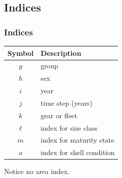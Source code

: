 \documentclass{beamer}
\begin{document}
\subsection{Indices}
\begin{frame}
\frametitle{Indices}
\begin{table}
  \centering
  \begin{tabular}{cl}
  \hline
  Symbol  & Description \\
  \hline
      $g$ & group \\
      $h$ & sex \\
      $i$ & year \\
      $j$ & time step (years) \\
      $k$ & gear or fleet \\
      $\ell$ & index for size class \\
      $m$ & index for maturity state \\
      $o$ & index for shell condition \\
  \hline
  \end{tabular}
\end{table}
Notice no area index.
\end{frame}

\end{document}
